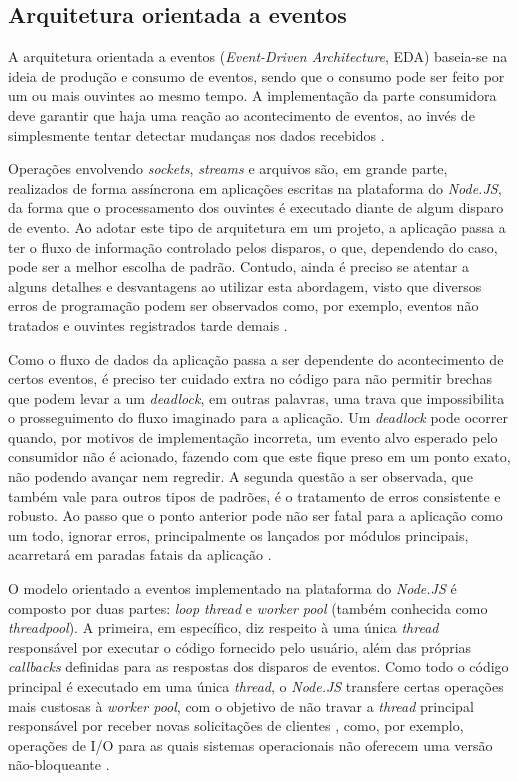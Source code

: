 \documentclass[12pt]{article}
\begin{document}
\subsection{Arquitetura orientada a eventos}

A arquitetura orientada a eventos (\textit{Event-Driven Architecture}, EDA) baseia-se na ideia de produção e consumo 
de eventos, sendo que o consumo pode ser feito por um ou mais ouvintes ao mesmo tempo. A implementação da parte consumidora 
deve garantir que haja uma reação ao acontecimento de eventos, ao invés de simplesmente tentar detectar 
mudanças nos dados recebidos \cite[p. 27]{DIOGORESENDE}.

Operações envolvendo \textit{sockets}, \textit{streams} e arquivos são, em grande parte, 
realizados de forma assíncrona em aplicações escritas na plataforma do \textit{Node.JS}, da forma que o processamento
dos ouvintes é executado diante de algum disparo de evento. \cite{MFO} Ao adotar este tipo de arquitetura em um projeto, 
a aplicação passa a ter o fluxo de informação controlado pelos disparos, o que, dependendo do caso, pode ser a melhor 
escolha de padrão. Contudo, ainda é preciso se atentar a alguns detalhes e desvantagens ao utilizar esta abordagem,
visto que diversos erros de programação podem ser observados como, por exemplo, eventos não tratados e ouvintes
registrados tarde demais \cite[p. 28]{DIOGORESENDE}.

Como o fluxo de dados da aplicação passa a ser dependente do acontecimento de certos eventos, é preciso ter cuidado 
extra no código para não permitir brechas que podem levar a um \textit{deadlock},
em outras palavras, uma trava que impossibilita o prosseguimento do fluxo imaginado para a aplicação. Um 
\textit{deadlock} pode ocorrer quando, por motivos de implementação incorreta, um evento alvo esperado pelo
consumidor não é acionado, fazendo com que este fique preso em um ponto exato, não podendo avançar nem regredir.
A segunda questão a ser observada, que também vale para outros tipos de padrões, é o tratamento de erros consistente
e robusto. Ao passo que o ponto anterior pode não ser fatal para a aplicação como um todo, ignorar erros, principalmente
os lançados por módulos principais, acarretará em paradas fatais da aplicação \cite[p. 28]{DIOGORESENDE}.

O modelo orientado a eventos implementado na plataforma do \textit{Node.JS} é composto por duas partes: 
\textit{loop thread} e \textit{worker pool} (também conhecida como \textit{threadpool}). A primeira, em específico, 
diz respeito à uma única \textit{thread} responsável por executar o código fornecido pelo usuário, além 
das próprias \textit{callbacks} definidas para as respostas dos disparos de eventos. Como todo o código principal 
é executado em uma única \textit{thread}, o \textit{Node.JS} transfere certas operações mais custosas à \textit{worker pool}, 
com o objetivo de não travar a \textit{thread} principal responsável por receber novas solicitações de 
clientes \cite{BUGS} \cite{ATOMICITY}, 
como, por exemplo, operações de I/O para as quais sistemas operacionais não oferecem uma versão não-bloqueante 
\cite{NODEBLOCKEVENTLOOP}. 
\end{document}
